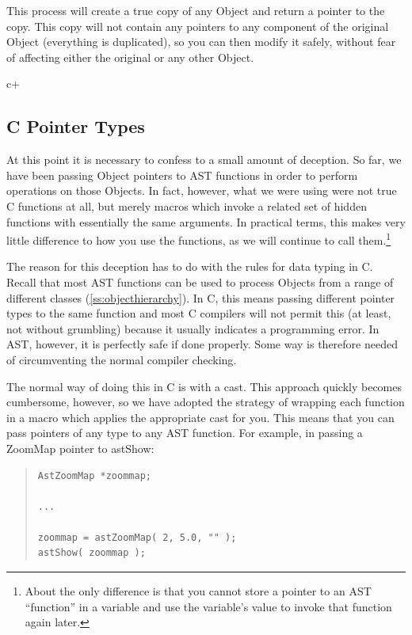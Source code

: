 \documentclass[twoside,11pt]{article}
\newcommand{\secref}[1]{\S\ref{#1}}
\renewcommand{\secref}[1]{\ref{#1}}
\begin{document}
This process will create a true copy of any Object and return a
pointer to the copy. This copy will not contain any pointers to any
component of the original Object (everything is duplicated), so you
can then modify it safely, without fear of affecting either the
original or any other Object.


c+
\subsection{C Pointer Types}

At this point it is necessary to confess to a small amount of
deception. So far, we have been passing Object pointers to AST
functions in order to perform operations on those Objects. In fact,
however, what we were using were not true C functions at all, but
merely macros which invoke a related set of hidden functions with
essentially the same arguments. In practical terms, this makes very
little difference to how you use the functions, as we will continue to
call them.\footnote{About the only difference is that you cannot store
a pointer to an AST ``function'' in a variable and use the variable's
value to invoke that function again later.}

The reason for this deception has to do with the rules for data typing
in C. Recall that most AST functions can be used to process Objects
from a range of different classes (\secref{ss:objecthierarchy}). In C,
this means passing different pointer types to the same function and
most C compilers will not permit this (at least, not without
grumbling) because it usually indicates a programming error. In AST,
however, it is perfectly safe if done properly. Some way is therefore
needed of circumventing the normal compiler checking.

The normal way of doing this in C is with a cast. This approach
quickly becomes cumbersome, however, so we have adopted the strategy
of wrapping each function in a macro which applies the appropriate
cast for you. This means that you can pass pointers of any type to any
AST function. For example, in passing a ZoomMap pointer to astShow:

\begin{quote}
\small
\begin{verbatim}
AstZoomMap *zoommap;

...

zoommap = astZoomMap( 2, 5.0, "" );
astShow( zoommap );
\end{verbatim}
\normalsize
\end{quote}
\end{document}
